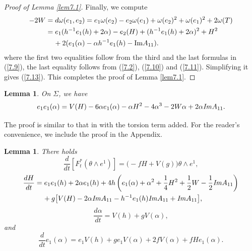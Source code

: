 \documentclass{amsart}
\newtheorem{lem}[theorem]{Lemma}
\theoremstyle{Corollary}
\numberwithin{equation}{section}
\begin{document}
\begin{proof}[Proof of Lemma \ref{lem7.1}]
Finally, we compute 
\begin{equation*}
\begin{split}
-2W&=d\omega(e_1,e_2)=e_1\omega(e_2)-e_2\omega(e_1)+\omega(e_2)^2+\omega(e_1)^2+2\omega(T)\\
&=e_1(h^{-1}e_1(h)+2\alpha)-e_2(H)+(h^{-1}e_1(h)+2\alpha)^2+H^2\\
&\hspace{4mm}+2
(e_1(\alpha)-\alpha h^{-1}e_1(h)-\mbox{Im}A_{11}).
\end{split}
\end{equation*}
where the first two equalities follow from the third and the last formulas in (\ref{7.9}), 
the last equality follows from (\ref{7.2}), (\ref{7.10}) and (\ref{7.11}). 
Simplifying it gives 
(\ref{7.13}). This completes the proof of Lemma \ref{lem7.1}. 
\end{proof}


\begin{lem}\label{lem7.2}
On $\Sigma$, we have 
\begin{equation}\label{7.17}
e_1e_1(\alpha)
=V(H)-6\alpha e_1(\alpha)-\alpha H^2-4\alpha^3-2W\alpha+2\alpha \mbox{\emph{Im}}A_{11}.
\end{equation}
\end{lem}

The proof is similar to that in \cite[Section 3.2, (3.24) in Lemma 5]{CYZ}
 with the torsion term added. For the reader's convenience, we
include the proof in the Appendix.



\begin{lem}\label{lem7.3}
There holds
\begin{equation}
\label{7.21}\frac{d}{dt}[F_t^*(\theta\wedge e^1)]
=\big(-fH+V(g)\big)\theta\wedge e^1,
\end{equation}
\begin{equation}\label{7.22}
\begin{split}
\frac{dH}{dt}
&=e_1e_1(h)+2\alpha e_1(h)+4h\left(e_1(\alpha)+\alpha^2+\frac{1}{4}H^2+\frac{1}{2}W-\frac{1}{2}\mbox{\emph{Im}}A_{11}\right)\\
&\hspace{4mm}
+g\big[V(H)-2\alpha\mbox{\emph{Im}}A_{11}-h^{-1}e_1(h)\mbox{\emph{Im}}A_{11}+\mbox{\emph{Im}}A_{11}\big],
\end{split}
\end{equation}
\begin{equation}\label{7.23}
\frac{d\alpha}{dt}
=V(h)+gV(\alpha),
\end{equation}
and 
\begin{equation}\label{7.24}
\frac{d}{dt}e_1(\alpha)=e_1V(h)+ge_1V(\alpha)+2fV(\alpha)+fHe_1(\alpha).
\end{equation}
\end{lem}
\end{document}
